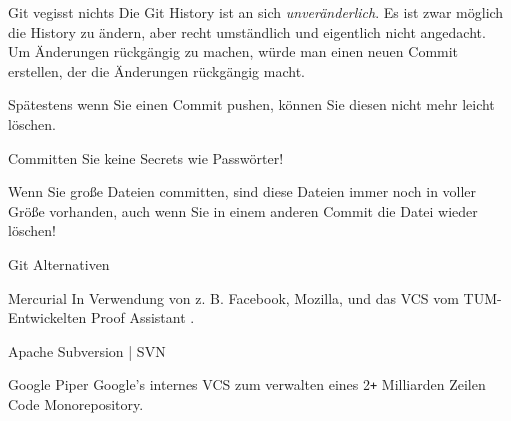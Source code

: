 \documentclass{setbeamer}
\begin{document}
\begin{frame}{Git vegisst nichts}
    Die Git History ist an sich \emph{unveränderlich}. Es ist zwar möglich die History zu ändern, aber recht umständlich und eigentlich nicht angedacht. Um Änderungen rückgängig zu machen, würde man einen neuen Commit erstellen, der die Änderungen rückgängig macht.

    \vspace{3mm}

    Spätestens wenn Sie einen Commit pushen, können Sie diesen nicht mehr leicht löschen.

    \pause
    \vspace{3mm}

    \begin{TUMBoxFill}[orange]{}{}
        Committen Sie keine Secrets wie Passwörter!
    \end{TUMBoxFill}

    \pause
    \vspace{3mm}

    \begin{TUMBoxFill}[orange]{}{}
        Wenn Sie große Dateien committen, sind diese Dateien immer noch in voller Größe vorhanden, auch wenn Sie in einem anderen Commit die Datei wieder löschen!
    \end{TUMBoxFill}

\end{frame}


\begin{frame}{Git Alternativen}
    \begin{TUMBoxInverse}{}{Mercurial}
        In Verwendung von z. B. Facebook, Mozilla, und das VCS vom TUM-Entwickelten Proof Assistant .
    \end{TUMBoxInverse}

    \begin{TUMBoxInverse}{}{Apache Subversion | SVN}
    \end{TUMBoxInverse}

    \begin{TUMBoxInverse}{}{Google Piper}
        Google's internes VCS zum verwalten eines 2\texttt{+} Milliarden Zeilen Code Monorepository.
    \end{TUMBoxInverse}
\end{frame}
\end{document}

